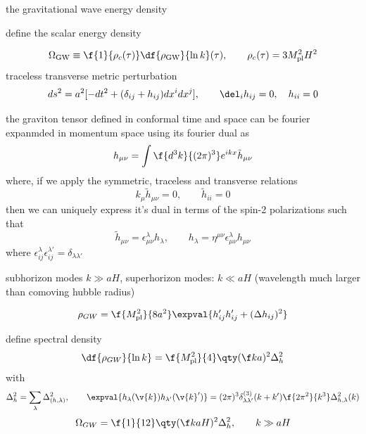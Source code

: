 

the gravitational wave energy density 

define the scalar energy density

\[
\Omega_{\rm GW}\equiv \f{1}{\rho_c(\tau)}\df{\rho_{\rm GW}}{\ln k}(\tau), \qquad \rho_c(\tau)=3M_{\rm pl}^2H^2
\]
traceless transverse metric perturbation
\[
ds^2=a^2[-dt^2+(\delta_{ij}+h_{ij})dx^idx^j], \qquad \del_i h_{ij}=0, \quad h_{ii}=0
\]

the graviton tensor defined in conformal time and space can be fourier expanmded in momentum space using its fourier dual  as
\[
h_{\mu\nu}= \int \f{d^3k}{(2\pi)^3} e^{ikx}\tilde{h}_{\mu\nu}
\]
where, if we apply the symmetric, traceless and transverse relations
\[
k_\mu\tilde{h}_{\mu\nu}=0, \qquad \tilde{h}_{ii}=0
\]
then we can uniquely express it's dual in terms of the spin-2 polarizations such that
\[
\tilde{h}_{\mu\nu}=\epsilon^\lambda_{\mu\nu}h_\lambda, \qquad h_\lambda=\eta^{\mu\nu}\epsilon^\lambda_{\mu\nu}h_{\mu\nu}
\]
where $\epsilon_{ij}^\lambda \epsilon_{ij}^{\lambda'}=\delta_{\lambda\lambda'}$



subhorizon modes $k\gg aH$, superhorizon modes: $k\ll aH$ (wavelength much larger than comoving hubble radius)

\[
\rho_{GW}=\f{M_{\rm pl}^2}{8a^2}\expval{h'_{ij}h'_{ij}+(\Delta h_{ij})^2}
\]

define spectral density
\[
\df{\rho_{GW}}{\ln k}=\f{M_{\rm pl}^2}{4}\qty(\f ka)^2\Delta_h^2
\]
with
\[
\Delta_h^2=\sum_\lambda \Delta^2_{(h,\lambda)}, \qquad \expval{h_\lambda(\v{k})h_{\lambda'}(\v{k}')}=(2\pi)^3\delta_{\lambda \lambda'}^{(3)}(k+k')\f{2\pi^2}{k^3}\Delta_{h,\lambda}^2(k)
\]
\[
\Omega_{GW}=\f{1}{12}\qty(\f k{aH})^2\Delta_h^2, \qquad k\gg aH
\]


